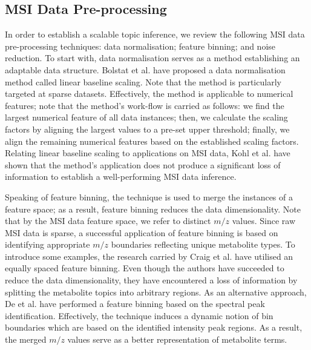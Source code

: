 \documentclass{mpaper}
\begin{document}
\subsection{MSI Data Pre-processing}


\par In order to establish a scalable topic inference, we review the following MSI data pre-processing techniques: data normalisation; feature binning; and noise reduction. To start with, data normalisation serves as a method establishing an adaptable data structure. Bolstat et al. \cite{bolstad2003comparison} have proposed a data normalisation method called linear baseline scaling. Note that the method is particularly targeted at sparse datasets. Effectively, the method is applicable to numerical features; note that the method's work-flow is carried as follows: we find the largest numerical feature of all data instances; then, we calculate the scaling factors by aligning the largest values to a pre-set upper threshold; finally, we align the remaining numerical features based on the established scaling factors. Relating linear baseline scaling to applications on MSI data, Kohl et al. \cite{kohl2012state} have shown that the method's application does not produce a significant loss of information to establish a well-performing MSI data inference. 

\par Speaking of feature binning, the technique is used to merge the instances of a feature space; as a result, feature binning reduces the data dimensionality. Note that by the MSI data feature space, we refer to distinct $m/z$ values. Since raw MSI data is sparse, a successful application of feature binning is based on identifying appropriate $m/z$ boundaries reflecting unique metabolite types. To introduce some examples, the research carried by Craig et al. \cite{craig2006scaling} have utilised an equally spaced feature binning. Even though the authors have succeeded to reduce the data dimensionality, they have encountered a loss of information by splitting the metabolite topics into arbitrary regions. As an alternative approach, De et al. \cite{de2008nmr} have performed a feature binning based on the spectral peak identification. Effectively, the technique induces a dynamic notion of bin boundaries which are based on the identified intensity peak regions. As a result, the merged $m/z$ values serve as a better representation of metabolite terms.
\end{document}
